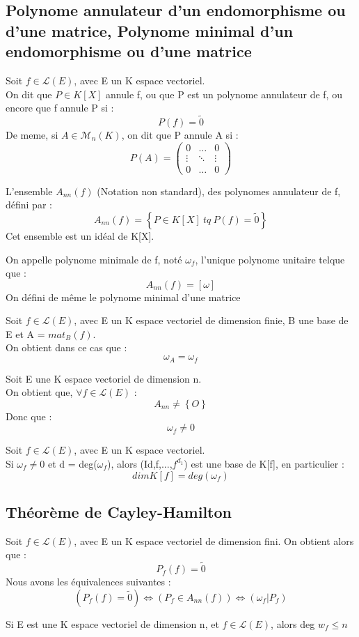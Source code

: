 \subsection{Polynome annulateur d'un endomorphisme ou d'une matrice, Polynome minimal d'un endomorphisme ou d'une matrice}
\begin{de}
Soit $f \in \mathcal{L}(E)$, avec E un K espace vectoriel.\\
On dit que $P \in K[X]$ annule f, ou que P est un polynome annulateur de f, ou encore que f annule P si : 
$$P(f) = \tilde{0}$$
De meme, si $A \in \mathcal{M}_n(K)$, on dit que P annule A si :
$$P(A) = \begin{pmatrix}
          0 & \dots & 0 \\
          \vdots & \ddots & \vdots \\
          0 & \dots & 0
         \end{pmatrix}
$$
\end{de}
\begin{prop}
L'ensemble $A_{nn}(f)$ (Notation non standard), des polynomes annulateur de f, défini par :
$$A_{nn}(f) = \left\lbrace P \in K[X]~ tq~ P(f) = \tilde{0}\right\rbrace $$
Cet ensemble est un idéal de K[X].
\end{prop}
\begin{de}
On appelle polynome minimale de f, noté $\omega_f$, l'unique polynome unitaire telque que : 
$$A_{nn}(f) = [\omega]$$
On défini de même le polynome minimal d'une matrice
\end{de}
\begin{prop}
Soit $f \in \mathcal{L}(E)$, avec E un K espace vectoriel de dimension finie, B une base de E et A = $mat_{B}(f)$.\\
On obtient dans ce cas que : 
$$\omega_A = \omega_f$$
\end{prop}
\begin{prop}
Soit E une K espace vectoriel de dimension n.\\
On obtient que, $\forall f \in \mathcal{L}(E)$ : 
$$A_{nn} \neq \left\lbrace O\right\rbrace $$
Donc que :
$$\omega_f \neq 0$$
\end{prop}
\begin{prop}
Soit $f \in \mathcal{L}(E)$, avec E un K espace vectoriel.\\
Si $\omega_f \neq 0$ et d = deg($\omega_f$), alors (Id,f,...,$f^{d_1}$) est une base de K[f], en particulier : 
$$dim K[f] = deg(\omega_f)$$
\end{prop}
\subsection{Théorème de Cayley-Hamilton}
\begin{theo}
Soit $f \in \mathcal{L}(E)$, avec E un K espace vectoriel de dimension fini. On obtient alors que :
$$P_f(f) = \tilde{0}$$
Nous avons les équivalences suivantes : 
$$(P_f(f) = \tilde{0}) \Leftrightarrow (P_f \in A_{nn}(f) )\Leftrightarrow (\omega_f | P_f)$$
\end{theo}
\begin{corr}
 Si E est une K espace vectoriel de dimension n, et $f \in \mathcal{L}(E)$, alors deg $w_f \leq n$
\end{corr}
